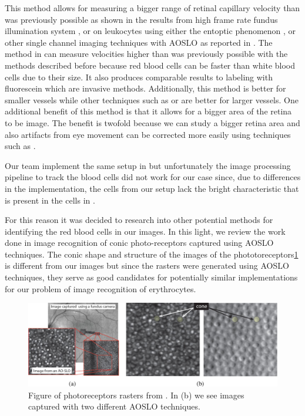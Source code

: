 \documentclass[]{article}
\begin{document}
This method allows for measuring a bigger range of retinal capillary velocity than was previously possible as shown in the results from high frame rate fundus illumination system \cite{bedggood_direct_2012}, or on leukocytes using either the entoptic phenomenon \cite{riva_blue_1980}\cite{grunwald_effect_1993}, or other single channel imaging techniques with AOSLO \cite{martin_pulsatility_2009}\cite{martin_direct_2005}\cite{tam_speed_2011}\cite{tam_characterization_2011} as reported in \cite{castro_rapid_2016}.
The method in\cite{castro_rapid_2016} can measure velocities higher than was previously possible with the methods described before because red blood cells can be faster than white blood cells due to their
size. 
It also produces comparable results to labeling with fluorescein\cite{yang_fluorescent_1997}\cite{paques_evaluation_2000} which are invasive methods.
Additionally, this method is better for smaller vessels  while other techniques such as \cite{zhong_vivo_2008} or \cite{riva_laser_1972} are better for larger vessels.
One additional benefit of this method is that it allows for a bigger area of the retina to be image.
The benefit is twofold because we can  study a bigger retina area and also artifacts from eye movement can be corrected more easily using techniques such as \cite{dubra_registration_2010}.

Our team implement the same setup in \cite{castro_rapid_2016} but unfortunately the image processing pipeline to track the blood cells did not work for our case since, due to differences in the implementation, the cells from our setup lack the bright characteristic that is present in the cells in \cite{castro_rapid_2016}. 

For this reason it was decided to research into other potential methods for identifying the red blood cells in our images.
In this light, we review the work done in image recognition of conic photo-receptors captured using AOSLO techniques.
The conic shape and structure of the images of the phototoreceptors\ref{fig:bergelles-photoreceptors} is different from our images but since the rasters were generated using AOSLO techniques, they serve as good candidates for potentially similar implementations for our problem of image recognition of erythrocytes.

\begin{figure}[ht]
	\centering
	\includegraphics[width=\textwidth]{bergelles-photoreceptord.jpg}
	\caption{Figure of photoreceptors rasters from \cite{bergeles_unsupervised_2017}.
		In (b) we see images captured with two different AOSLO techniques.
	}
	\label{fig:bergelles-photoreceptors}
\end{figure}
\end{document}
